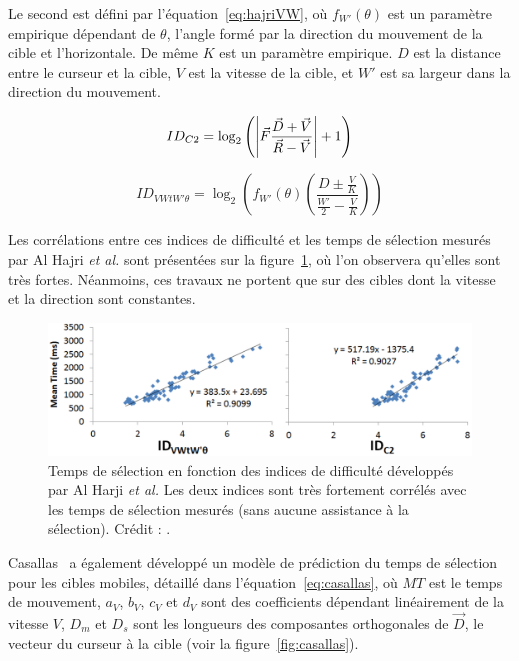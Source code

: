 	Le second est défini par l'équation~\ref{eq:hajriVW}, où $f_{W'}(\theta)$ est un paramètre empirique dépendant de $\theta$, l'angle formé par la direction du mouvement de la cible et l'horizontale. De même $K$ est un paramètre empirique. $D$ est la distance entre le curseur et la cible, $V$ est la vitesse de la cible, et $W'$ est sa largeur dans la direction du mouvement.
	
	\begin{equation}
		\label{eq:hajriC2}
		ID_{C2} = \log_{2}\left(\abs*{\vec{F} \frac{\vec{D}+\vec{V}}{\vec{R}-\vec{V}}} + 1 \right)
	\end{equation}
	
	\begin{equation}
		\label{eq:hajriVW}
		ID_{VWtW'\theta} = \log_{2}\left( f_{W'}(\theta) \left( \frac{D \pm \frac{V}{K}}{\frac{W'}{2} - \frac{V}{K}} \right) \right)
	\end{equation}
	
	Les corrélations entre ces indices de difficulté et les temps de sélection mesurés par Al Hajri \emph{et al.} sont présentées sur la figure~\ref{fig:holdID}, où l'on observera qu'elles sont très fortes. Néanmoins, ces travaux ne portent que sur des cibles dont la vitesse et la direction sont constantes.
	
	\begin{figure}[H]
		\centering
		\includegraphics[width=\textwidth]{figures/ch2/holdID}
		\caption[ID vs. nature du mouvement et temps de sélection]{Temps de sélection en fonction des indices de difficulté développés par Al Harji \emph{et al.} Les deux indices sont très fortement corrélés avec les temps de sélection mesurés (sans aucune assistance à la sélection). Crédit : \cite{hajri2011moving}.}
		\label{fig:holdID}
	\end{figure}
	
	Casallas~\cite{casallas2015prediction} a également développé un modèle de prédiction du temps de sélection pour les cibles mobiles, détaillé dans l'équation~\ref{eq:casallas}, où $MT$ est le temps de mouvement, $a_{V}$, $b_{V}$, $c_{V}$ et $d_{V}$ sont des coefficients dépendant linéairement de la vitesse $V$, $D_{m}$ et $D_{s}$ sont les longueurs des composantes orthogonales de $\vec{D}$, le vecteur du curseur à la cible (voir la figure~\ref{fig:casallas}).
	
